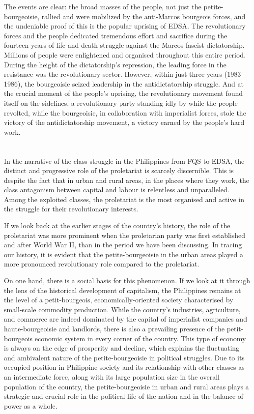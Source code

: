 The events are clear: 
the broad masses of the people, 
not just the petite-bourgeoisie, 
rallied and were mobilized 
by the anti-Marcos bourgeois forces, 
and the undeniable proof of this 
is the popular uprising of EDSA. 
The revolutionary forces and the people 
dedicated tremendous effort and sacrifice 
during the fourteen years of life-and-death struggle 
against the Marcos fascist dictatorship. 
Millions of people were enlightened and organised 
throughout this entire period. 
During the height of the dictatorship's repression, 
the leading force in the resistance 
was the revolutionary sector. 
However, 
within just three years (1983--1986), 
the bourgeoisie seized leadership in the antidictatorship struggle. 
And at the crucial moment of the people's uprising, 
the revolutionary movement found itself on the sidelines, 
a revolutionary party standing idly by 
while the people revolted, 
while the bourgeoisie, 
in collaboration with imperialist forces, 
stole the victory of the antidictatorship movement, 
a victory earned by the people's hard work.


\section{}
In the narrative of the class struggle in the Philippines 
from FQS to EDSA, 
the distinct and progressive role of the proletariat 
is scarcely discernible. 
This is despite the fact that in urban and rural areas, 
in the places where they work, 
the class antagonism between capital and labour is relentless and unparalleled. 
Among the exploited classes,
the proletariat is the most organised and active 
in the struggle for their revolutionary interests.

If we look back at the earlier stages of the country's history,
the role of the proletariat was more prominent 
when the proletarian party was first established 
and after World War II,
than in the period we have been discussing. 
In tracing our history, 
it is evident that the petite-bourgeoisie in the urban areas 
played a more pronounced revolutionary role compared to the proletariat.

On one hand, 
there is a social basis for this phenomenon. 
If we look at it through the lens of the historical development of capitalism, 
the Philippines remains at the level 
of a petit-bourgeois, economically-oriented society 
characterised by small-scale commodity production. 
While the country's industries, agriculture, and commerce 
are indeed dominated by 
the capital of imperialist companies 
and haute-bourgeoisie 
and landlords, 
there is also a prevailing presence of the petit-bourgeois economic system 
in every corner of the country. 
This type of economy is always on the edge of prosperity and decline, 
which explains the fluctuating and ambivalent nature 
of the petite-bourgeoisie in political struggles.
Due to its occupied position in Philippine society 
and its relationship with other classes as an intermediate force, 
along with its large population size in the overall population of the country, 
the petite-bourgeoisie in urban and rural areas 
plays a strategic and crucial role 
in the political life of the nation 
and in the balance of power as a whole.


